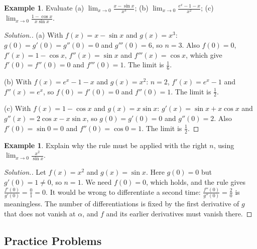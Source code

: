 \documentclass[11pt,a4paper]{article}
\numberwithin{equation}{section}
\theoremstyle{definition}
\newtheorem{exa}[thm]{Example}
\newenvironment{solution}
  {\renewcommand{\qedsymbol}{}\begin{proof}[\textit{Solution}.]}
  {\end{proof}}
\begin{document}
\begin{exa}
Evaluate (a) $\displaystyle\lim_{x\rightarrow 0}\frac{x - \sin x}{x^3}$; (b) $\displaystyle\lim_{x\rightarrow 0}\frac{e^x - 1 - x}{x^2}$; (c) $\displaystyle\lim_{x\rightarrow 0}\frac{1-\cos x}{x\sin x}$.
\end{exa}

\begin{solution}
(a) With $f(x) = x - \sin x$ and $g(x) = x^3$: $g(0) = g'(0) = g''(0) = 0$ and $g'''(0) = 6$, so $n = 3$. Also $f(0) = 0$, $f'(x) = 1 - \cos x$, $f''(x) = \sin x$ and $f'''(x) = \cos x$, which give $f'(0) = f''(0) = 0$ and $f'''(0) = 1$. The limit is $\frac{1}{6}$.

(b) With $f(x) = e^x - 1 - x$ and $g(x) = x^2$: $n = 2$, $f'(x) = e^x - 1$ and $f''(x) = e^x$, so $f(0) = f'(0) = 0$ and $f''(0) = 1$. The limit is $\frac{1}{2}$.

(c) With $f(x) = 1 - \cos x$ and $g(x) = x\sin x$: $g'(x) = \sin x + x\cos x$ and $g''(x) = 2\cos x - x\sin x$, so $g(0) = g'(0) = 0$ and $g''(0) = 2$. Also $f'(0) = \sin 0 = 0$ and $f''(0) = \cos 0 = 1$. The limit is $\frac{1}{2}$.
\end{solution}

\begin{exa}
Explain why the rule must be applied with the right $n$, using $\displaystyle\lim_{x\rightarrow 0}\frac{x^2}{\sin x}$.
\end{exa}

\begin{solution}
Let $f(x) = x^2$ and $g(x) = \sin x$. Here $g(0) = 0$ but $g'(0) = 1\neq 0$, so $n = 1$. We need $f(0) = 0$, which holds, and the rule gives $\frac{f'(0)}{g'(0)} = \frac{0}{1} = 0$. It would be wrong to differentiate a second time: $\frac{f''(0)}{g''(0)} = \frac{2}{0}$ is meaningless. The number of differentiations is fixed by the first derivative of $g$ that does not vanish at $\alpha$, and $f$ and its earlier derivatives must vanish there.
\end{solution}


\subsection{Practice Problems}
\end{document}

